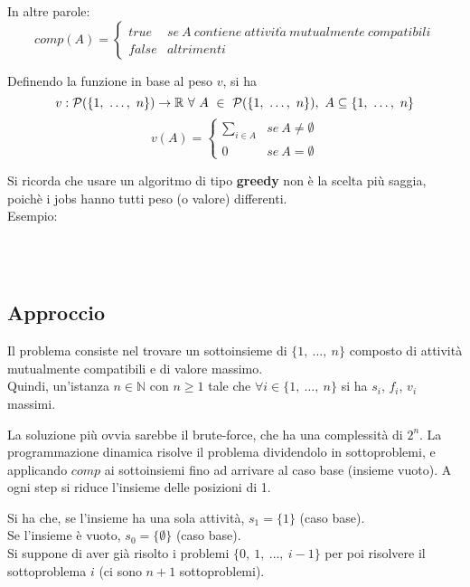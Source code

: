 In altre parole:
$$comp(A) = 
\begin{cases}
	true & se\ A\ contiene\ attivit\grave{a}\ mutualmente\ compatibili \\
	false & altrimenti
	\end{cases}$$	
	
Definendo la funzione in base al peso $v$, si ha
$$v : \mathcal{P}(\{1, \ \dots, \ n\}) \rightarrow \mathbb{R}\ \forall \ A\ \in\ \mathcal{P}(\{1, \ \dots, \ n\}),\ A \subseteq \{1, \ \dots, \ n\}$$
$$v(A) = 
\begin{cases}
\sum_{i \in A}& se\ A \neq \emptyset \\
0 & se\ A = \emptyset
\end{cases}$$	

Si ricorda che usare un algoritmo di tipo \textbf{greedy} non è la scelta più saggia, poichè i jobs hanno tutti peso (o valore) differenti. \\
Esempio: 
\begin{center}
\begin{ganttchart}{0}{12}
     \\
     \\
\end{ganttchart}
\end{center}

\subsection{Approccio}
Il problema consiste nel trovare un sottoinsieme di $\{1,\ \dots,\ n\}$ composto di attività mutualmente compatibili e di valore massimo. \\
Quindi, un'istanza $n \in \mathbb{N}$ con $n \geq 1$ tale che $\forall i \in \{1,\ \dots,\ n\}$ si ha $s_i$, $f_i$, $v_i$ massimi.

La soluzione più ovvia sarebbe il brute-force, che ha una complessità di $2^n$. 
La programmazione dinamica risolve il problema dividendolo in sottoproblemi, e applicando $comp$ ai sottoinsiemi fino ad arrivare al caso base (insieme vuoto). A ogni step si riduce l'insieme delle posizioni di 1.

Si ha che, se l'insieme ha una sola attività, $s_1 = \{1\}$ (caso base). \\
Se l'insieme è vuoto, $s_0 = \{\emptyset\}$ (caso base). \\
Si suppone di aver già risolto i problemi $\{0,\ 1,\ \dots,\ i-1\}$ per poi risolvere il sottoproblema $i$ (ci sono $n + 1$ sottoproblemi).

